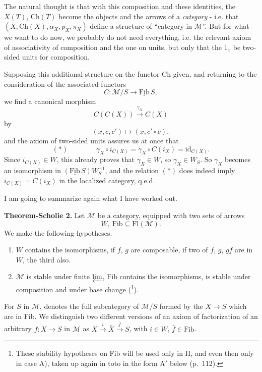 \documentclass[11pt]{article}
\newcommand{\printedpage}[1]{\marginpar{\footnotesize p.~#1}}
\newcommand{\msp}[1]{\marginpar{\footnotesize [#1]}}
\newcommand{\Fib}{\underline{\mathrm{Fib}}}
\newcommand{\Ch}{\mathrm{Ch}}
\begin{document}
\printedpage{67}

The natural thought is that with this composition and these identities, the $X(T)$, $\Ch(T)$ become the objects and the arrows of a \textit{category} - i.e. that $(X,\Ch(X),\alpha_X,p_X,\pi_X)$ define a structure of ``category in $\mathcal{M}$''. But for what we want to do now, we probably do not need everything, i.e.
\msp{page 107}
the relevant axiom of associativity of composition and the one on units, but only that the $1_x$ be two-sided units for composition.

Supposing this additional structure on the functor Ch given, and returning to the consideration of the associated functors %
\[
C : \mathcal{M}/S\longrightarrow\Fib\,S,
\]
we find a canonical morphism
\[
C(C(X))\xrightarrow{\gamma_X}C(X)
\]
by
\[
(x,c,c')\longmapsto(x,c'\circ c),
\]
and the axiom of two-sided units assures us at once that
\[
(\ast)\qquad\qquad\gamma_X\circ i_{C(X)}=\gamma_X\circ C(i_X)=\mathrm{id}_{C(X)}.
\]
Since $i_{C(X)}\in W$, this already proves that $\gamma_X\in W$, so $\gamma_X\in W_S$. So $\gamma_X$ becomes an isomorphism in $(\Fib\,S)W_S^{-1}$, and the relation $(\ast)$ does indeed imply $i_{C(X)}=C(i_X)$ in the localized category, q.e.d.

I am going to summarize again what I have worked out.

\msp{page 108}
\textbf{Theorem-Scholie 2.} Let $\mathcal{M}$ be a category, equipped with two sets of arrows
\[
W,\ \mathrm{Fib}\subseteq\mathrm{Fl}(\mathcal{M}).
\]
We make the following hypotheses.

\begin{enumerate}[label={}]
\item[$1^o$] $W$ contains the isomorphisms, if $f$, $g$ are composable, if two of $f$, $g$, $gf$ are in $W$, the third also.
\item[$2^o$] $\mathcal{M}$ is stable under finite $\varprojlim$, Fib contains the isomorphisms, is stable under composition and under base change (\footnote[59]{These stability hypotheses on Fib will be used only in II, and even then only in case A), taken up again in toto in the form A$'$ below (p.~112).}).
\end{enumerate}

For $S$ in $\mathcal{M}$, \fbox{$\Fib\,S$} denotes the full subcategory of $\mathcal{M}/S$ formed by the $X\longrightarrow S$ which are in Fib. We distinguish two different versions of an axiom of factorization of an arbitrary $f : X\longrightarrow S$ in $\mathcal{M}$ as $X\xrightarrow{i}\bar X\xrightarrow{\bar f}S$, with $i\in W$, $\bar f\in\mathrm{Fib}$.
\end{document}
